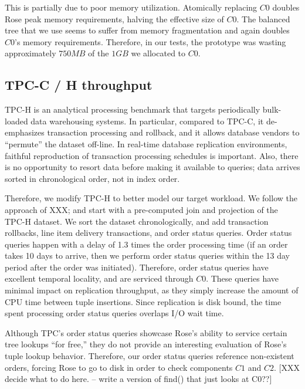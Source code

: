 \documentclass{vldb}
\newcommand{\rows}{Rose\xspace}
\newcommand{\rowss}{Rose's\xspace}
\begin{document}
This is partially due to poor memory utilization.  Atomically
replacing $C0$ doubles \rows peak memory requirements, halving the
effective size of $C0$.  The balanced tree that we use seems to suffer
from memory fragmentation and again doubles $C0$'s memory
requirements.  Therefore, in our tests, the prototype was wasting
approximately $750MB$ of the $1GB$ we allocated to $C0$.

\subsection{TPC-C / H throughput}

TPC-H is an analytical processing benchmark that targets periodically
bulk-loaded data warehousing systems.  In particular, compared to
TPC-C, it de-emphasizes transaction processing and rollback, and it
allows database vendors to ``permute'' the dataset off-line.  In
real-time database replication environments, faithful reproduction of
transaction processing schedules is important.  Also, there is no
opportunity to resort data before making it available to queries; data
arrives sorted in chronological order, not in index order.

Therefore, we modify TPC-H to better model our target workload.  We
follow the approach of XXX; and start with a pre-computed join and
projection of the TPC-H dataset.  We sort the dataset chronologically,
and add transaction rollbacks, line item delivery transactions, and
order status queries.  Order status queries happen with a delay of 1.3 times
the order processing time (if an order takes 10 days
to arrive, then we perform order status queries within the 13 day
period after the order was initiated).  Therefore, order status
queries have excellent temporal locality, and are serviced
through $C0$.   These queries have minimal impact on replication
throughput, as they simply increase the amount of CPU time between
tuple insertions.  Since replication is disk bound, the time spent
processing order status queries overlaps I/O wait time.

Although TPC's order status queries showcase \rowss ability to service
certain tree lookups ``for free,'' they do not provide an interesting
evaluation of \rowss tuple lookup behavior.  Therefore, our order status queries reference
non-existent orders, forcing \rows to go to disk in order to check components
$C1$ and $C2$.  [XXX decide what to do here.  -- write a version of find() that just looks at C0??]  
\end{document}
